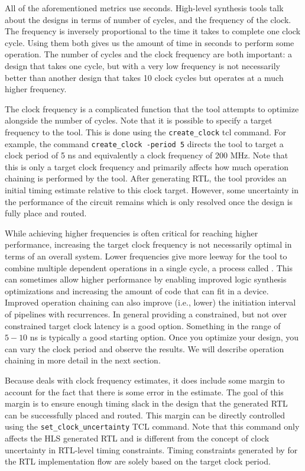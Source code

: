 All of the aforementioned metrics use seconds. High-level synthesis tools talk about the designs in terms of number of cycles, and the frequency of the clock. The frequency is inversely proportional to the time it takes to complete one clock cycle. Using them both gives us the amount of time in seconds to perform some operation. The number of cycles and the clock frequency are both important: a design that takes one cycle, but with a very low frequency is not necessarily better than another design that takes 10 clock cycles but operates at a much higher frequency. 

The clock frequency is a complicated function that the \VHLS tool attempts to optimize alongside the number of cycles. Note that it is possible to specify a target frequency to the \VHLS tool. This is done using the \lstinline{create_clock} tcl command.  For example, the command \lstinline{create_clock -period 5} directs the tool to target a clock period of 5 ns and equivalently a clock frequency of 200 MHz.  Note that this is only a target clock frequency and primarily affects how much operation chaining is performed by the tool.  After generating RTL, the \VHLS tool provides an initial timing estimate relative to this clock target.  However, some uncertainty in the performance of the circuit remains which is only resolved once the design is fully place and routed.

While achieving higher frequencies is often critical for reaching higher performance, increasing the target clock frequency is not necessarily optimal in terms of an overall system. Lower frequencies give more leeway for the tool to combine multiple dependent operations in a single cycle, a process called . This can sometimes allow higher performance by enabling improved logic synthesis optimizations and increasing the amount of code that can fit in a device. Improved operation chaining can also improve (i.e., lower) the initiation interval of pipelines with recurrences.   In general providing a constrained, but not over constrained target clock latency is a good option. Something in the range of $5 - 10$ ns is typically a good starting option. Once you optimize your design, you can vary the clock period and observe the results. We will describe operation chaining in more detail in the next section.

Because \VHLS deals with clock frequency estimates, it does include some margin to account for the fact that there is some error in the estimate.  The goal of this margin is to ensure enough timing slack in the design that the generated RTL can be successfully placed and routed.  This margin can be directly controlled using the \lstinline{set_clock_uncertainty} TCL command.  Note that this command only affects the HLS generated RTL and is different from the concept of clock uncertainty in RTL-level timing constraints.  Timing constraints generated by \VHLS for the RTL implementation flow are solely based on the target clock period.

